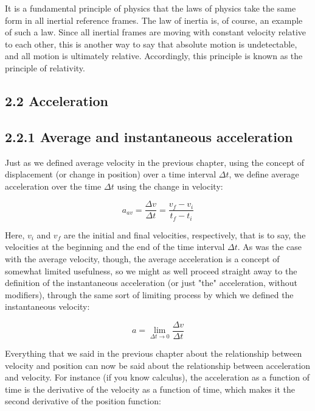 \documentclass[10pt]{article}
\begin{document}
It is a fundamental principle of physics that the laws of physics take the same form in all inertial reference frames. The law of inertia is, of course, an example of such a law. Since all inertial frames are moving with constant velocity relative to each other, this is another way to say that absolute motion is undetectable, and all motion is ultimately relative. Accordingly, this principle is known as the principle of relativity.

\subsection*{2.2 Acceleration}
\subsection*{2.2.1 Average and instantaneous acceleration}
Just as we defined average velocity in the previous chapter, using the concept of displacement (or change in position) over a time interval $\Delta t$, we define average acceleration over the time $\Delta t$ using the change in velocity:


\begin{equation*}
a_{a v}=\frac{\Delta v}{\Delta t}=\frac{v_{f}-v_{i}}{t_{f}-t_{i}} \tag{2.1}
\end{equation*}


Here, $v_{i}$ and $v_{f}$ are the initial and final velocities, respectively, that is to say, the velocities at the beginning and the end of the time interval $\Delta t$. As was the case with the average velocity, though, the average acceleration is a concept of somewhat limited usefulness, so we might as well proceed straight away to the definition of the instantaneous acceleration (or just "the" acceleration, without modifiers), through the same sort of limiting process by which we defined the instantaneous velocity:


\begin{equation*}
a=\lim _{\Delta t \rightarrow 0} \frac{\Delta v}{\Delta t} \tag{2.2}
\end{equation*}


Everything that we said in the previous chapter about the relationship between velocity and position can now be said about the relationship between acceleration and velocity. For instance (if you know calculus), the acceleration as a function of time is the derivative of the velocity as a function of time, which makes it the second derivative of the position function:
\end{document}
